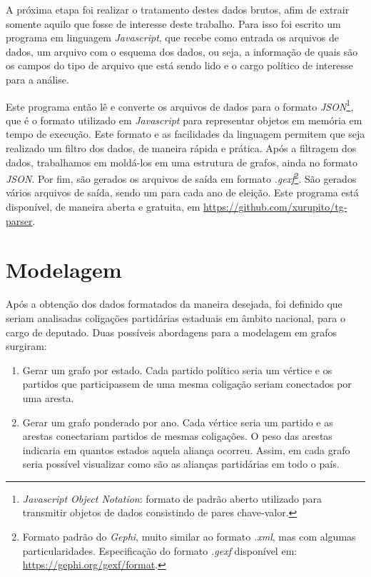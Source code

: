 A próxima etapa foi realizar o tratamento destes dados brutos, afim de extrair somente aquilo que fosse de interesse deste trabalho. Para isso foi escrito um programa em linguagem \emph{Javascript}, que recebe como entrada os arquivos de dados, um arquivo com o esquema dos dados, ou seja, a informação de quais são os campos do tipo de arquivo que está sendo lido e o cargo político de interesse para a análise.

Este programa então lê e converte os arquivos de dados para o formato \emph{JSON}\footnote{\emph{Javascript Object Notation}: formato de padrão aberto utilizado para transmitir objetos de dados consistindo de pares chave-valor.}, que é o formato utilizado em \emph{Javascript} para representar objetos em memória em tempo de execução. Este formato e as facilidades da linguagem permitem que seja realizado um filtro dos dados, de maneira rápida e prática. Após a filtragem dos dados, trabalhamos em moldá-los em uma estrutura de grafos, ainda no formato \emph{JSON}. Por fim, são gerados os arquivos de saída em formato \emph{.gexf}\footnote{Formato padrão do \emph{Gephi}, muito similar ao formato \emph{.xml}, mas com algumas particularidades. Especificação do formato \emph{.gexf} disponível em: \url{https://gephi.org/gexf/format}.}. São gerados vários arquivos de saída, sendo um para cada ano de eleição. Este programa está disponível, de maneira aberta e gratuita, em \url{https://github.com/xurupito/tg-parser}.

\section{Modelagem}
\label{proposta__modelagem}

Após a obtenção dos dados formatados da maneira desejada, foi definido que seriam analisadas coligações partidárias estaduais em âmbito nacional, para o cargo de deputado. Duas possíveis abordagens para a modelagem em grafos surgiram:
\begin{enumerate}
    \item Gerar um grafo por estado. Cada partido político seria um vértice e os partidos que participassem de uma mesma coligação seriam conectados por uma aresta.
    \item Gerar um grafo ponderado por ano. Cada vértice seria um partido e as arestas conectariam partidos de mesmas coligações. O peso das arestas indicaria em quantos estados aquela aliança ocorreu. Assim, em cada grafo seria possível visualizar como são as alianças partidárias em todo o país.
\end{enumerate}

